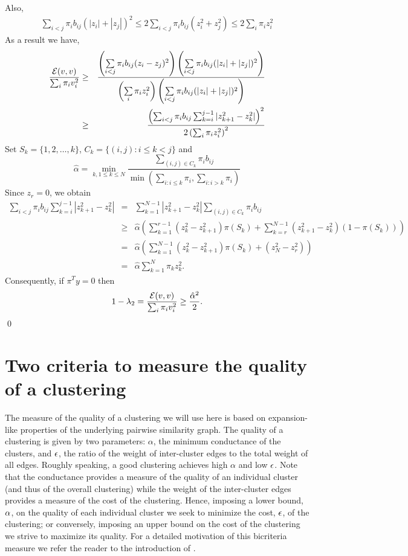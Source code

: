 \documentclass{book}
\numberwithin{exercise}{chapter}
\begin{document}
Also,
\begin{eqnarray*}
\sum_{i<j}\pi_ib_{ij}(|z_i|+|z_j|)^2
\leq 2\sum_{i<j}\pi_ib_{ij}(z_i^2+z_j^2) \le  2\sum_i \pi_i z_i^2
\end{eqnarray*}
As a result we have,
\begin{eqnarray*}
\frac{{\mathcal E}(v,v)}{\sum_i \pi_i v_i^2}&\geq&
\frac{\left(\sum\limits_{i<j}\pi_ib_{ij}(z_i-z_j)^2\right)
\left(\sum\limits_{i<j}\pi_ib_{ij}(|z_i|+|z_j|)^2\right)}
{\left(\sum\limits_i \pi_i z_i^2\right)\left(\sum\limits_{i<j}\pi_ib_{ij}(|z_i|+|z_j|)^2\right)}\\
&\geq&\frac{\left(\sum_{i<j}\pi_ib_{ij}\sum_{k=i}^{j-1}|z_{k+1}^2-z_k^2|\right)^2}
	{2\left(\sum_i \pi_i z_i^2\right)^2}
\end{eqnarray*}
Set $S_k=\{1,2,\ldots,k\}$, $C_k=\{(i,j):i\leq k<j\}$ and
$$\hat{\alpha} = \min_{k,1\leq k\leq N} \frac{\sum\limits_{(i,j)\in C_k}\pi_i b_{ij}}
	{\min (\sum\limits_{i:i\leq k} \pi_i ,\sum\limits_{i: i>k} \pi_i)}$$
Since $z_r=0$, we obtain
\begin{eqnarray*}
\sum_{i<j}\pi_ib_{ij}\sum_{k=i}^{j-1}|z_{k+1}^2-z_k^2|
& = &\sum_{k=1}^{N-1}|z_{k+1}^2-z_k^2| \sum_{(i,j)\in C_k}\pi_ib_{ij}\\
&\geq & \hat{\alpha}\left(\sum_{k=1}^{r-1}(z_k^2-z_{k+1}^2)\pi(S_k)+\sum_{k=r}^{N-1}(z_{k+1}
^2-z_k^2)(1-\pi(S_k))\right)\\
& = &\hat{\alpha}\left(\sum_{k=1}^{N-1}(z_k^2-z_{k+1}^2)\pi (S_k)+(z_N^2-z_r^2)\right)\\
&=& \hat{\alpha}\sum_{k=1}^{N}\pi_kz_k^2.
\end{eqnarray*}
Consequently, if $\pi^T y=0$ then
$$1-\lambda_2=\frac{{\mathcal E}(v,v)}{\sum_i \pi_i v_i^2}\geq \frac{\hat{\alpha}^2}{2}.$$
\qed


\section{Two criteria to measure the quality of a clustering}

The measure of the quality of a clustering we will use here is based on
expansion-like properties of the underlying pairwise similarity graph.
The quality of a clustering is given by two parameters:
$\alpha$, the minimum conductance
of the clusters, and $\epsilon$, the ratio of the weight
of inter-cluster edges to the total weight of all edges. Roughly speaking,
a good clustering achieves high $\alpha$ and low $\epsilon$.
Note that the conductance provides a measure of the quality of an individual
cluster (and thus of the overall clustering) while the weight of the inter-cluster edges
provides a measure of the cost of the clustering. Hence, imposing a lower bound, $\alpha$, on the quality
of each individual cluster we seek to minimize the cost, $\epsilon$, of the clustering; or conversely, imposing an upper
bound on the cost of the clustering we strive to maximize its quality. For a detailed motivation of this bicriteria measure we refer the reader to the introduction of \cite{KVV04}.
\end{document}
